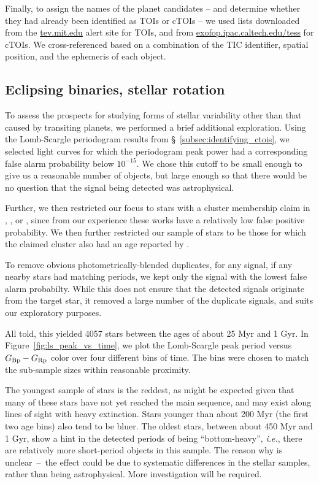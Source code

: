 \documentclass[12pt,twocolumn,tighten]{aastex62}
\begin{document}
Finally, to assign the names of the planet candidates -- and determine
whether they had already been identified as TOIs or cTOIs -- we used
lists downloaded from the \url{tev.mit.edu} alert site for TOIs, and
from \url{exofop.ipac.caltech.edu/tess} for cTOIs.  We
cross-referenced based on a combination of the TIC identifier, spatial
position, and the ephemeris of each object.


\subsection{Eclipsing binaries, stellar rotation}
\label{subsec:notplanets}

To assess the prospects for studying forms of stellar variability
other than that caused by transiting planets, we performed a brief
additional exploration.
Using the Lomb-Scargle periodogram results from
\S~\ref{subsec:identifying_ctois}, we selected light curves 
for which the periodogram peak power had a corresponding false alarm
probability below $10^{-15}$.
We chose this cutoff to be small enough to give us a reasonable number
of objects, but large enough so that there would be no question that
the signal being detected was astrophysical.

Further, we then restricted our focus to stars with a cluster
membership claim in \citet{cantat-gaudin_gaia_2018},
\citet{Kharchenko_et_al_2013}, or \citet{gaia_hr_2018}, since from our
experience these works have a relatively low false positive
probability.
We then further restricted our sample of stars to be those for which
the claimed cluster also had an age reported by
\citet{Kharchenko_et_al_2013}.

To remove obvious photometrically-blended duplicates, for any signal,
if any nearby stars had matching periods, we kept only the signal with
the lowest false alarm probabilty.
While this does not ensure that the detected signals originate from
the target star, it removed a large number of the duplicate signals,
and suits our exploratory purposes.

All told, this yielded 4057 stars between the ages of about 25 Myr and
1 Gyr.
In Figure~\ref{fig:ls_peak_vs_time}, we plot the Lomb-Scargle peak period
versus $G_{\rm Bp} - G_{\rm Rp}$ color over four different bins of
time.
The bins were chosen to match the sub-sample sizes within reasonable
proximity.

The youngest sample of stars is the reddest, as might be expected
given that many of these stars have not yet reached the main sequence,
and may exist along lines of sight with heavy extinction.
Stars younger than about 200 Myr (the first two age bins) also tend
to be bluer.
The oldest stars, between about 450 Myr and 1 Gyr, show a hint in
the detected periods of being ``bottom-heavy'', {\it i.e.}, there are
relatively more short-period objects in this sample.
The reason why is unclear~--~the effect could be due to systematic
differences in the stellar samples, rather than being astrophysical.
More investigation will be required.
\end{document}
